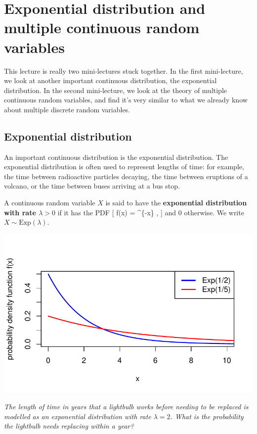 \documentclass[
  letterpaper,
  DIV=11,
  numbers=noendperiod]{scrreprt}
\theoremstyle{remark}
\begin{document}
\hypertarget{L17-exp-multiple}{%
\chapter{Exponential distribution and multiple continuous random
variables}\label{L17-exp-multiple}}

This lecture is really two mini-lectures stuck together. In the first
mini-lecture, we look at another important continuous distribution, the
exponential distribution. In the second mini-lecture, we look at the
theory of multiple continuous random variables, and find it's very
similar to what we already know about multiple discrete random
variables.

\hypertarget{exponential}{%
\section{Exponential distribution}\label{exponential}}

An important continuous distribution is the exponential distribution.
The exponential distribution is often used to represent lengths of time:
for example, the time between radioactive particles decaying, the time
between eruptions of a volcano, or the time between buses arriving at a
bus stop.

A continuous random variable \(X\) is said to have the
\textbf{exponential distribution with rate \(\lambda > 0\)} if it has
the PDF {[} f(x) = \lambda {}\^{}\{-\lambda x\}
\qquad {}, {]} and 0 otherwise. We write
\(X \sim \text{Exp}(\lambda)\).

\includegraphics{sections/L16-exponential-multi_files/figure-pdf/exp-pic-1.pdf}

\emph{The length of time in years that a lightbulb works before needing
to be replaced is modelled as an exponential distribution with rate
\(\lambda = 2\). What is the probability the lightbulb needs replacing
within a year?}
\end{document}
